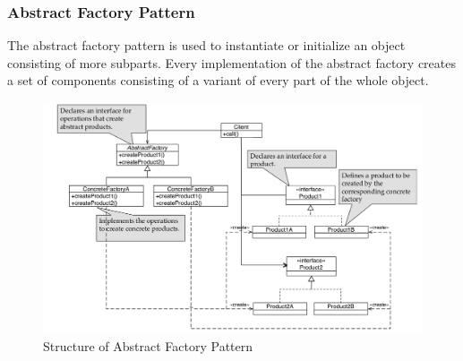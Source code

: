 \subsubsection{Abstract Factory Pattern}
The abstract factory pattern is used to instantiate or initialize an object consisting of more subparts.
Every implementation of the abstract factory creates a set of components consisting of a variant of every part of the whole object.

\begin{figure}[h]
	\centering
	\includegraphics[width=\linewidth]{images/pattern_abstract_factory.png}
	\caption{Structure of Abstract Factory Pattern}
\end{figure}
\newpage
